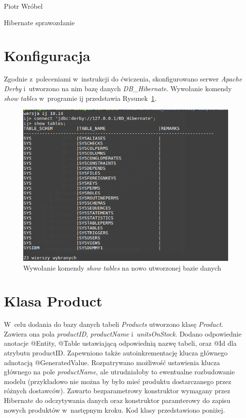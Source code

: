 \documentclass[12pt, a4paper]{mwart}
\begin{document}
\begin{center}
Piotr Wróbel

Hibernate \ppauza sprawozdanie
\end{center}

\tableofcontents

\section{Konfiguracja}

Zgodnie z~poleceniami w~instrukcji do ćwiczenia, skonfigurowano serwer \textit{Apache Derby} i~utworzono na nim bazę danych \textit{DB\_Hibernate}. Wywołanie komendy \textit{show tables} w~programie ij przedstawia Rysunek~\ref{rys:1.1}.

\begin{figure}[ht]
  \centering
  \includegraphics[scale=0.5]{I/1.png}
  \caption{Wywołanie komendy \textit{show tables} na nowo utworzonej bazie danych}
  \label{rys:1.1}
\end{figure}

\section{Klasa Product}

W~celu dodania do bazy danych tabeli \textit{Products} utworzono klasę \textit{Product}. Zawiera ona pola \textit{productID}, \textit{productName} i~\textit{unitsOnStock}. Dodano odpowiednie anotacje \ppauza @Entity, @Table ustawiającą odpowiednią nazwę tabeli, oraz @Id  dla atrybutu productID. Zapewniono także autoinkrementację klucza głównego adnotacją @GeneratedValue. Rozpatrywano możliwość ustawienia klucza głównego na pole \textit{productName}, ale utrudniałoby to ewentualne rozbudowanie modelu (przykładowo nie można by było mieć produktu dostarczanego przez różnych dostawców). Zawarto bezparametrowy konstruktor wymagany przez Hibernate do odczytywania danych oraz konstruktor paramterowy do zapisu nowych produktów w~następnym kroku. Kod klasy przedstawiono poniżej.
\end{document}
